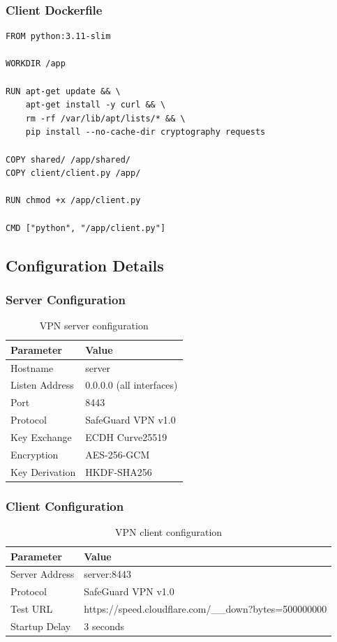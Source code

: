 \documentclass[12pt,a4paper]{article}
\begin{document}
\subsubsection{Client Dockerfile}

\begin{lstlisting}[style=bashstyle, caption={Client container configuration}]
FROM python:3.11-slim

WORKDIR /app

RUN apt-get update && \
    apt-get install -y curl && \
    rm -rf /var/lib/apt/lists/* && \
    pip install --no-cache-dir cryptography requests

COPY shared/ /app/shared/
COPY client/client.py /app/

RUN chmod +x /app/client.py

CMD ["python", "/app/client.py"]
\end{lstlisting}

\subsection{Configuration Details}

\subsubsection{Server Configuration}

\begin{table}[H]
\centering
\begin{tabular}{@{}ll@{}}
\toprule
\textbf{Parameter} & \textbf{Value} \\ \midrule
Hostname & server \\
Listen Address & 0.0.0.0 (all interfaces) \\
Port & 8443 \\
Protocol & SafeGuard VPN v1.0 \\
Key Exchange & ECDH Curve25519 \\
Encryption & AES-256-GCM \\
Key Derivation & HKDF-SHA256 \\
\bottomrule
\end{tabular}
\caption{VPN server configuration}
\end{table}

\subsubsection{Client Configuration}

\begin{table}[H]
\centering
\begin{tabular}{@{}ll@{}}
\toprule
\textbf{Parameter} & \textbf{Value} \\ \midrule
Server Address & server:8443 \\
Protocol & SafeGuard VPN v1.0 \\
Test URL & https://speed.cloudflare.com/\_\_down?bytes=500000000 \\
Startup Delay & 3 seconds \\
\bottomrule
\end{tabular}
\caption{VPN client configuration}
\end{table}
\end{document}
